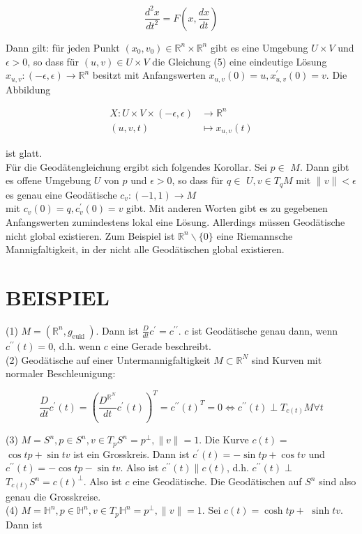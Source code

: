 \documentclass[10pt, letterpaper]{article}
\begin{document}
\begin{equation*}
\frac{d^{2} x}{d t^{2}}=F\left(x, \frac{d x}{d t}\right) \tag{5}
\end{equation*}


Dann gilt: für jeden Punkt $\left(x_{0}, v_{0}\right) \in \mathbb{R}^{n} \times \mathbb{R}^{n}$ gibt es eine Umgebung $U \times V$ und $\epsilon>0$, so dass für $(u, v) \in U \times V$ die Gleichung (5) eine eindeutige Lösung $x_{u, v}:(-\epsilon, \epsilon) \rightarrow \mathbb{R}^{n}$ besitzt mit Anfangswerten $x_{u, v}(0)=u, x_{u, v}^{\prime}(0)=v$. Die Abbildung

$$
\begin{aligned}
X: U \times V \times(-\epsilon, \epsilon) & \rightarrow \mathbb{R}^{n} \\
(u, v, t) & \mapsto x_{u, v}(t)
\end{aligned}
$$

ist glatt.\\
Für die Geodätengleichung ergibt sich folgendes Korollar. Sei $p \in$ $M$. Dann gibt es offene Umgebung $U$ von $p$ und $\epsilon>0$, so dass für $q \in$ $U, v \in T_{q} M$ mit $\|v\|<\epsilon$ es genau eine Geodätische $c_{v}:(-1,1) \rightarrow M$\\
mit $c_{v}(0)=q, c_{v}^{\prime}(0)=v$ gibt. Mit anderen Worten gibt es zu gegebenen Anfangswerten zumindestens lokal eine Lösung. Allerdings müssen Geodätische nicht global existieren. Zum Beispiel ist $\mathbb{R}^{n} \backslash\{0\}$ eine Riemannsche Mannigfaltigkeit, in der nicht alle Geodätischen global existieren.

\section*{BEISPIEL}
(1) $M=\left(\mathbb{R}^{n}, g_{\text {eukl }}\right)$. Dann ist $\frac{D}{d t} c^{\prime}=c^{\prime \prime}$. $c$ ist Geodätische genau dann, wenn $c^{\prime \prime}(t)=0$, d.h. wenn $c$ eine Gerade beschreibt.\\
(2) Geodätische auf einer Untermannigfaltigkeit $M \subset \mathbb{R}^{N}$ sind Kurven mit normaler Beschleunigung:

$$
\frac{D}{d t} c^{\prime}(t)=\left(\frac{D^{\mathbb{R}^{N}}}{d t} c^{\prime}(t)\right)^{T}=c^{\prime \prime}(t)^{T}=0 \Longleftrightarrow c^{\prime \prime}(t) \perp T_{c(t)} M \forall t
$$

(3) $M=S^{n}, p \in S^{n}, v \in T_{p} S^{n}=p^{\perp},\|v\|=1$. Die Kurve $c(t)=$ $\cos t p+\sin t v$ ist ein Grosskreis. Dann ist $c^{\prime}(t)=-\sin t p+\cos t v$ und $c^{\prime \prime}(t)=-\cos t p-\sin t v$. Also ist $c^{\prime \prime}(t) \| c(t)$, d.h. $c^{\prime \prime}(t) \perp$ $T_{c(t)} S^{n}=c(t)^{\perp}$. Also ist $c$ eine Geodätische. Die Geodätischen auf $S^{n}$ sind also genau die Grosskreise.\\
(4) $M=\mathbb{H}^{n}, p \in \mathbb{H}^{n}, v \in T_{p} \mathbb{H}^{n}=p^{\perp},\|v\|=1$. Sei $c(t)=\cosh t p+$ $\sinh t v$. Dann ist
\end{document}
